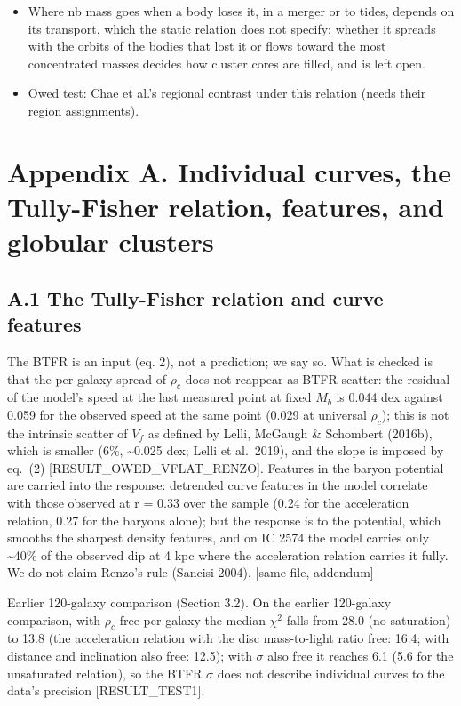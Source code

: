 \documentclass[
  10pt,
]{article}
\begin{document}
\begin{itemize}
\item Where nb mass goes when a body loses it, in a merger or to tides, depends on its transport, which the static relation does not specify; whether it spreads with the orbits of the bodies that lost it or flows toward the most concentrated masses decides how cluster cores are filled, and is left open.
\item Owed test: Chae et al.'s regional contrast under this relation (needs their region assignments).
\end{itemize}


\section{Appendix A. Individual curves, the Tully-Fisher relation, features, and globular clusters}\label{appendix-a.-individual-curves-the-tully-fisher-relation-features-and-globular-clusters}

\subsection{A.1 The Tully-Fisher relation and curve features}\label{the-tully-fisher-relation-and-curve-features}

The BTFR is an input (eq. 2), not a prediction; we say so. What is
checked is that the per-galaxy spread of $\rho_c$ does not reappear as
BTFR scatter: the residual of the model's speed at the last measured point at fixed $M_b$ is 0.044 dex against 0.059 for the observed speed at the same point (0.029 at universal $\rho_c$); this is not the intrinsic scatter of $V_f$ as defined by Lelli, McGaugh \& Schombert (2016b), which is smaller (6\%, \textasciitilde{}0.025 dex; Lelli et al.~2019), and the slope is imposed by eq.~(2)
{[}RESULT\_OWED\_VFLAT\_RENZO{]}. Features in the baryon potential are
carried into the response: detrended curve features in the model
correlate with those observed at r = 0.33 over the sample (0.24 for the
acceleration relation, 0.27 for the baryons alone); but the response is
to the potential, which smooths the sharpest density features, and on IC
2574 the model carries only \textasciitilde{}40\% of the observed dip at 4
kpc where the acceleration relation carries it fully. We do not claim
Renzo's rule (Sancisi 2004). {[}same file, addendum{]}

Earlier 120-galaxy comparison (Section 3.2). On the earlier 120-galaxy comparison, with $\rho_c$ free per galaxy the median $\chi^2$ falls from 28.0 (no saturation) to 13.8 (the acceleration relation with the disc mass-to-light ratio free: 16.4; with distance and inclination also free: 12.5); with $\sigma$ also free it reaches 6.1 (5.6 for the unsaturated relation), so the BTFR $\sigma$ does not describe individual curves to the data's precision {[}RESULT\_TEST1{]}.
\end{document}
